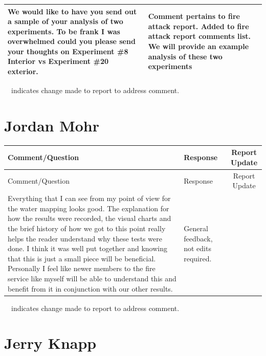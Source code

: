 \documentclass[12pt,oneside]{book}
\begin{document}
\begin{landscape}
\begin{longtable}{|L{4in}|L{3.75in}|c|}
		\hline
		We would like to have you send out a sample of your analysis of two experiments.  To be frank I was overwhelmed could you please send your thoughts on Experiment \#8 Interior vs  Experiment \#20 exterior.  & 
		Comment pertains to fire attack report. Added to fire attack report comments list. We will provide an example analysis of these two experiments & \\

		\hline

\end{longtable}
\checkmark~~indicates change made to report to address comment.

\newpage

\section{Jordan Mohr}
\begin{longtable}{|L{4in}|L{3.75in}|c|}

		\hline
		Comment/Question & Response & Report Update \\ 
		\toprule[1.0pt] \endfirsthead
		\hline
		Comment/Question & Response & Report Update \\ 
		\toprule[1.0pt] \endhead
		\hline
		Everything that I can see from my point of view for the water mapping looks good. The explanation for how the results were recorded, the visual charts and the brief history of how we got to this point really helps the reader understand why these tests were done. I think it was well put together and knowing that this is just a small piece will be beneficial. Personally I feel like newer members to the fire service like myself will be able to understand this and benefit from it in conjunction with our other results. & 
		General feedback, not edits required. & \\
 
 		\hline
\end{longtable}
\checkmark~~indicates change made to report to address comment.

\newpage

\section{Jerry Knapp}
\begin{longtable}{|L{4in}|L{3.75in}|c|}


\end{longtable}
\end{landscape}
\end{document}
